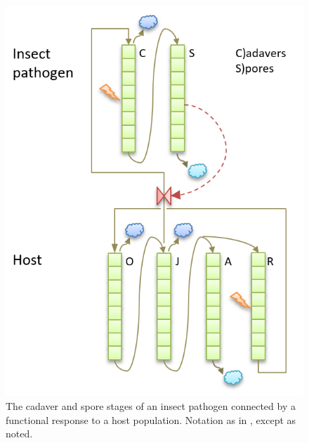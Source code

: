 \begin{figure} [ht]
\centering
\includegraphics[width=.6\textwidth]{graphics/phys-dev-appl-4}
\caption{The cadaver and spore stages of an insect pathogen connected by a functional response to a host population. Notation as in , except as noted.} 
\label{fig:phys-dev-appl-4}
\end{figure}

%



